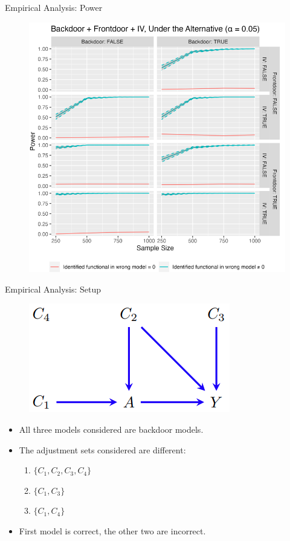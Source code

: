 \documentclass{beamer}
\begin{document}
\begin{frame}{Empirical Analysis: Power}
	\begin{figure}
		\center
		\includegraphics[scale=0.3]{power.png}
	\end{figure}
\end{frame}

\begin{frame}{Empirical Analysis: Setup}
	\begin{figure}
		\center
		\includegraphics[scale=0.3]{empirical_dag.png}
	\end{figure}
	\vspace{1em}
	\begin{itemize}
		\item All three models considered are backdoor models.
		\item The adjustment sets considered are different:
			\begin{enumerate}
				\item $ \{ C_1, C_2, C_3, C_4 \} $
				\item $ \{ C_1, C_3 \} $
				\item $ \{ C_1, C_4 \} $
			\end{enumerate}
		\item First model is correct, the other two are incorrect.
	\end{itemize}
\end{frame}
\end{document}
